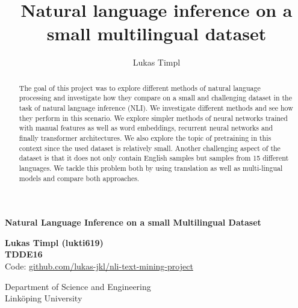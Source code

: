 \documentclass[acmsmall,nonacm]{acmart}
\begin{document}
\begin{titlepage}
  \begin{center}
      \vspace*{1cm}
      
      \huge\textbf{Natural Language Inference on a small Multilingual Dataset}

      \vspace{0.5cm}
           
      \vspace{1.5cm}
      \large
      \textbf{Lukas Timpl (lukti619)} \\
      \textbf{TDDE16} \\
      \vspace{0.8cm}
      Code: \href{https://github.com/lukas-jkl/nli-text-mining-project}{github.com/lukas-jkl/nli-text-mining-project}

      \vfill
             
      \vspace{0.8cm}
       
      Department of Science and Engineering\\
      Link\"{o}ping University\\
           
  \end{center}
\end{titlepage}

\title{Natural language inference on a small multilingual dataset}

\author{Lukas Timpl}


\begin{abstract}
The goal of this project was to explore different methods of natural language processing and investigate how they compare on a small and challenging dataset in the task of natural language inference (NLI). We investigate different methods and see how they perform in this scenario. 
We explore simpler methods of neural networks trained with manual features as well as word embeddings, recurrent neural networks and finally transformer architectures. 
We also explore the topic of pretraining in this context since the used dataset is relatively small. Another challenging aspect of the dataset is that it does not only contain English samples but samples from 15 different languages. We tackle this problem both by using translation as well as multi-lingual models and compare both approaches.
\end{abstract}
\end{document}
